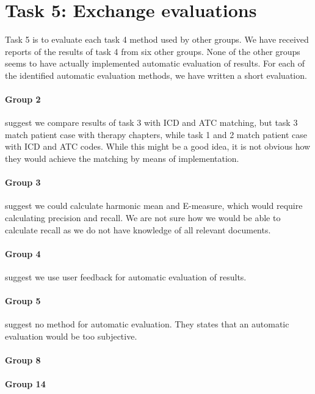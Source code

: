 \section{Task 5: Exchange evaluations}
Task 5 is to evaluate each task 4 method used by other groups.
We have received reports of the results of task 4 from six other groups. 
None of the other groups seems to have actually implemented automatic
evaluation of results. For each of the identified automatic evaluation methods,
we have written a short evaluation.

\paragraph{Group 2} suggest we compare results of task 3 with ICD and ATC
matching, but task 3 match patient case with therapy chapters, while task 1
and 2 match patient case with ICD and ATC codes. While this might be a good idea,
it is not obvious how they would achieve the matching by means of implementation.

\paragraph{Group 3} suggest we could calculate harmonic mean and E-measure,
which would require calculating precision and recall. We are not sure how we
would be able to calculate recall as we do not have knowledge of all relevant
documents.

\paragraph{Group 4} suggest we use user feedback for automatic evaluation of
results.

\paragraph{Group 5} suggest no method for automatic evaluation. They states
that an automatic evaluation would be too subjective.

\paragraph{Group 8}

\paragraph{Group 14}


